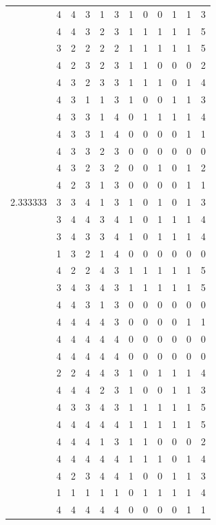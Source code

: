 \documentclass[]{book}
\theoremstyle{definition}
\theoremstyle{definition}
\theoremstyle{definition}
\theoremstyle{remark}
\begin{document}
\begin{table}
{\begin{tabular}[t]{rrrrrrrrrrrr}
 & 4 & 4 & 3 & 1 & 3 & 1 & 0 & 0 & 1 & 1 & 3\\
 & 4 & 4 & 3 & 2 & 3 & 1 & 1 & 1 & 1 & 1 & 5\\
 & 3 & 2 & 2 & 2 & 2 & 1 & 1 & 1 & 1 & 1 & 5\\
 & 4 & 2 & 3 & 2 & 3 & 1 & 1 & 0 & 0 & 0 & 2\\
 & 4 & 3 & 2 & 3 & 3 & 1 & 1 & 1 & 0 & 1 & 4\\
 & 4 & 3 & 1 & 1 & 3 & 1 & 0 & 0 & 1 & 1 & 3\\
 & 4 & 3 & 3 & 1 & 4 & 0 & 1 & 1 & 1 & 1 & 4\\
 & 4 & 3 & 3 & 1 & 4 & 0 & 0 & 0 & 0 & 1 & 1\\
 & 4 & 3 & 3 & 2 & 3 & 0 & 0 & 0 & 0 & 0 & 0\\
 & 4 & 3 & 2 & 3 & 2 & 0 & 0 & 1 & 0 & 1 & 2\\
 & 4 & 2 & 3 & 1 & 3 & 0 & 0 & 0 & 0 & 1 & 1\\
2.333333 & 3 & 3 & 4 & 1 & 3 & 1 & 0 & 1 & 0 & 1 & 3\\
 & 3 & 4 & 4 & 3 & 4 & 1 & 0 & 1 & 1 & 1 & 4\\
 & 3 & 4 & 3 & 3 & 4 & 1 & 0 & 1 & 1 & 1 & 4\\
 & 1 & 3 & 2 & 1 & 4 & 0 & 0 & 0 & 0 & 0 & 0\\
 & 4 & 2 & 2 & 4 & 3 & 1 & 1 & 1 & 1 & 1 & 5\\
 & 3 & 4 & 3 & 4 & 3 & 1 & 1 & 1 & 1 & 1 & 5\\
 & 4 & 4 & 3 & 1 & 3 & 0 & 0 & 0 & 0 & 0 & 0\\
 & 4 & 4 & 4 & 4 & 3 & 0 & 0 & 0 & 0 & 1 & 1\\
 & 4 & 4 & 4 & 4 & 4 & 0 & 0 & 0 & 0 & 0 & 0\\
 & 4 & 4 & 4 & 4 & 4 & 0 & 0 & 0 & 0 & 0 & 0\\
 & 2 & 2 & 4 & 4 & 3 & 1 & 0 & 1 & 1 & 1 & 4\\
 & 4 & 4 & 4 & 2 & 3 & 1 & 0 & 0 & 1 & 1 & 3\\
 & 4 & 3 & 3 & 4 & 3 & 1 & 1 & 1 & 1 & 1 & 5\\
 & 4 & 4 & 4 & 4 & 4 & 1 & 1 & 1 & 1 & 1 & 5\\
 & 4 & 4 & 4 & 1 & 3 & 1 & 1 & 0 & 0 & 0 & 2\\
 & 4 & 4 & 4 & 4 & 4 & 1 & 1 & 1 & 0 & 1 & 4\\
 & 4 & 2 & 3 & 4 & 4 & 1 & 0 & 0 & 1 & 1 & 3\\
 & 1 & 1 & 1 & 1 & 1 & 0 & 1 & 1 & 1 & 1 & 4\\
 & 4 & 4 & 4 & 4 & 4 & 0 & 0 & 0 & 0 & 1 & 1\\

\end{tabular}}
\end{table}
\end{document}
